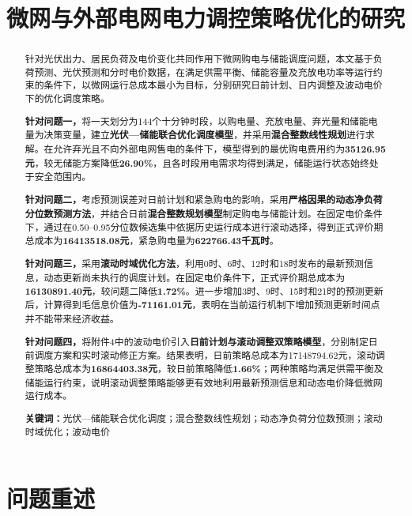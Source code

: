 \documentclass[UTF8,a4paper,12pt,fontset=fandol]{ctexart}
\title{\heiti\bfseries 微网与外部电网电力调控策略优化的研究}
\author{}
\date{}
\numberwithin{equation}{section}
\begin{document}
\vspace{-5.5em}
\maketitle
\vspace{-2.2em}

\begin{abstract}
\normalsize
针对光伏出力、居民负荷及电价变化共同作用下微网购电与储能调度问题，本文基于负荷预测、光伏预测和分时电价数据，在满足供需平衡、储能容量及充放电功率等运行约束的条件下，以微网运行总成本最小为目标，分别研究日前计划、日内调整及波动电价下的优化调度策略。

\textbf{针对问题一，}将一天划分为144个十分钟时段，以购电量、充放电量、弃光量和储能电量为决策变量，建立\textbf{光伏—储能联合优化调度模型}，并采用\textbf{混合整数线性规划}进行求解。在允许弃光且不向外部电网售电的条件下，模型得到的最优购电费用约为\textbf{35126.95元}，较无储能方案降低\textbf{26.90\%}，且各时段用电需求均得到满足，储能运行状态始终处于安全范围内。

\textbf{针对问题二，}考虑预测误差对日前计划和紧急购电的影响，采用\textbf{严格因果的动态净负荷分位数预测方法}，并结合日前\textbf{混合整数规划模型}制定购电与储能计划。在固定电价条件下，通过在0.50--0.95分位数候选集中依据历史运行成本进行滚动选择，得到正式评价期总成本为\textbf{16413518.08元}，紧急购电量为\textbf{622766.43千瓦时}。

\textbf{针对问题三，}采用\textbf{滚动时域优化方法}，利用0时、6时、12时和18时发布的最新预测信息，动态更新尚未执行的调度计划。在固定电价条件下，正式评价期总成本为\textbf{16130891.40元}，较问题二降低\textbf{1.72\%}。进一步增加3时、9时、15时和21时的预测更新后，计算得到毛信息价值为\textbf{-71161.01元}，表明在当前运行机制下增加预测更新时间点并不能带来经济收益。

\textbf{针对问题四，}将附件4中的波动电价引入\textbf{日前计划与滚动调整双策略模型}，分别制定日前调度方案和实时滚动修正方案。结果表明，日前策略总成本为17148794.62元，滚动调整策略总成本为\textbf{16864403.38元}，较日前策略降低\textbf{1.66\%}；两种策略均满足供需平衡及储能运行约束，说明滚动调整策略能够更有效地利用最新预测信息和动态电价降低微网运行成本。

\par\medskip
\noindent\textbf{关键词：}光伏—储能联合优化调度；混合整数线性规划；动态净负荷分位数预测；滚动时域优化；波动电价\par
\end{abstract}
\clearpage



\section{问题重述}
\end{document}
